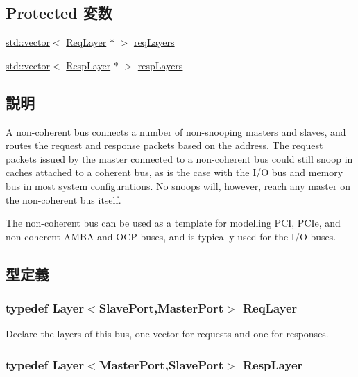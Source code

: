 \subsection*{Protected 変数}
\begin{DoxyCompactItemize}
\item 
\hyperlink{classstd_1_1vector}{std::vector}$<$ \hyperlink{classBaseBus_1_1Layer}{ReqLayer} $\ast$ $>$ \hyperlink{classNoncoherentBus_ab124575386549f77de080cd9fcaf2ba0}{reqLayers}
\item 
\hyperlink{classstd_1_1vector}{std::vector}$<$ \hyperlink{classBaseBus_1_1Layer}{RespLayer} $\ast$ $>$ \hyperlink{classNoncoherentBus_a2f42dda70e78f1e5e9574f11b465d173}{respLayers}
\end{DoxyCompactItemize}


\subsection{説明}
A non-\/coherent bus connects a number of non-\/snooping masters and slaves, and routes the request and response packets based on the address. The request packets issued by the master connected to a non-\/coherent bus could still snoop in caches attached to a coherent bus, as is the case with the I/O bus and memory bus in most system configurations. No snoops will, however, reach any master on the non-\/coherent bus itself.

The non-\/coherent bus can be used as a template for modelling PCI, PCIe, and non-\/coherent AMBA and OCP buses, and is typically used for the I/O buses. 

\subsection{型定義}
\hypertarget{classNoncoherentBus_ae15f02c0dca186fbfbd2f7b732e5b441}{
\subsubsection[{ReqLayer}]{\setlength{\rightskip}{0pt plus 5cm}typedef {\bf Layer}$<${\bf SlavePort},{\bf MasterPort}$>$ {\bf ReqLayer}}}
\label{classNoncoherentBus_ae15f02c0dca186fbfbd2f7b732e5b441}
Declare the layers of this bus, one vector for requests and one for responses. \hypertarget{classNoncoherentBus_a40797c56ea5eaf481f56dfdc3ab1b399}{
\subsubsection[{RespLayer}]{\setlength{\rightskip}{0pt plus 5cm}typedef {\bf Layer}$<${\bf MasterPort},{\bf SlavePort}$>$ {\bf RespLayer}}}
\label{classNoncoherentBus_a40797c56ea5eaf481f56dfdc3ab1b399}


